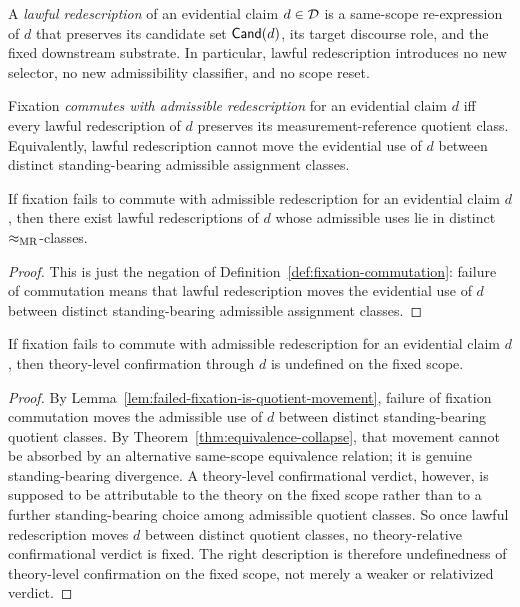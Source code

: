 \begin{definition}
\label{def:lawful-redescription-evidential}
A \emph{lawful redescription} of an evidential claim $d\in\mathcal{D}$ is a same-scope re-expression of $d$
that preserves its candidate set $\mathsf{Cand}(d)$, its target discourse role, and the fixed downstream
substrate. In particular, lawful redescription introduces no new selector, no new admissibility
classifier, and no scope reset.
\end{definition}

\begin{definition}
\label{def:fixation-commutation}
Fixation \emph{commutes with admissible redescription} for an evidential claim $d$ iff every lawful
redescription of $d$ preserves its measurement-reference quotient class. Equivalently, lawful
redescription cannot move the evidential use of $d$ between distinct standing-bearing admissible
assignment classes.
\end{definition}

\begin{lemma}
\label{lem:failed-fixation-is-quotient-movement}
If fixation fails to commute with admissible redescription for an evidential claim $d$, then there
exist lawful redescriptions of $d$ whose admissible uses lie in distinct $\mathrel{\approx_{\mathrm{MR}}}$-classes.
\end{lemma}

\begin{proof}
This is just the negation of Definition~\ref{def:fixation-commutation}: failure of commutation means
that lawful redescription moves the evidential use of $d$ between distinct standing-bearing admissible
assignment classes.
\end{proof}

\begin{theorem}
\label{thm:fixation-commutation-necessity}
If fixation fails to commute with admissible redescription for an evidential claim $d$, then
 theory-level confirmation through $d$ is undefined on the fixed scope.
\end{theorem}

\begin{proof}
By Lemma~\ref{lem:failed-fixation-is-quotient-movement}, failure of fixation commutation moves the
admissible use of $d$ between distinct standing-bearing quotient classes. By
Theorem~\ref{thm:equivalence-collapse}, that movement cannot be absorbed by an alternative
same-scope equivalence relation; it is genuine standing-bearing divergence. A theory-level
confirmational verdict, however, is supposed to be attributable to the theory on the fixed scope rather
than to a further standing-bearing choice among admissible quotient classes. So once lawful
redescription moves $d$ between distinct quotient classes, no theory-relative confirmational verdict is
fixed. The right description is therefore undefinedness of theory-level confirmation on the fixed scope,
not merely a weaker or relativized verdict.
\end{proof}

